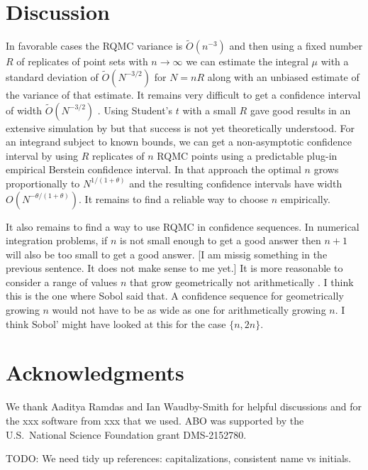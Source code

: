 \documentclass{article}
\newcommand{\art}[1]{\begingroup\color{blue}#1\endgroup}
\newcommand{\fred}[1]{\begingroup\color{red}#1\endgroup}
\begin{document}
\section{Discussion}\label{sec:discussion}



In favorable cases
the RQMC variance is $\tilde O(n^{-3})$ and then
using a fixed number $R$ of replicates of
point sets with $n\to\infty$ we can estimate
the integral $\mu$ with a standard deviation 
of $\tilde O(N^{-3/2})$ for $N=nR$ along with
an unbiased estimate of the variance of that estimate.
It remains very difficult to get a confidence 
interval of width $\tilde O(N^{-3/2})$ \cite{err4qmc}.
Using Student's $t$ with a small $R$ gave good
results in an extensive simulation by \cite{LEcEtal24a}
but that success is not yet theoretically understood.
For an integrand subject to known bounds, we can get
a non-asymptotic confidence interval by using $R$
replicates of $n$ RQMC points using a
predictable plug-in empirical Berstein confidence
interval.  In that approach the optimal $n$
grows proportionally to $N^{1/(1+\theta)}$ and
the resulting confidence intervals have width
$O(N^{-\theta/(1+\theta)})$.
It remains to find a reliable way to choose $n$
empirically. 

It also remains to find a way to
use RQMC in confidence sequences.  In numerical
integration problems, if $n$ is not small enough
to get a good answer then $n+1$ will also be
too small to get a good answer. \fred{[I am missig something in the previous sentence.  It does not make sense to me yet.]}  It is more reasonable
to consider a range of values $n$ that grow geometrically
not arithmetically \cite{sobo:1998}. \art{I think this is the one where Sobol said that.}  A confidence sequence for geometrically
growing $n$ would not have to be as wide as one for arithmetically
growing $n$.  \art{I think Sobol' might have looked at this
for the case $\{n,2n\}$.}



\section*{Acknowledgments}

We thank Aaditya Ramdas and Ian Waudby-Smith for helpful
discussions and for the \art{xxx} software
from \art{xxx} that we used.
ABO was supported by the U.S.\ National Science Foundation
grant DMS-2152780.

\art{TODO: We need tidy up references: capitalizations,
consistent name vs initials.}


\end{document}
